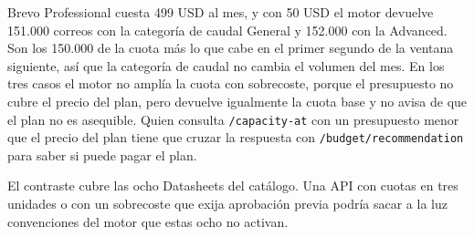 Brevo Professional cuesta 499 USD al mes, y con 50 USD el motor devuelve 151.000 correos con la categoría de caudal General y 152.000 con la Advanced.
Son los 150.000 de la cuota más lo que cabe en el primer segundo de la ventana siguiente, así que la categoría de caudal no cambia el volumen del mes.
En los tres casos el motor no amplía la cuota con sobrecoste, porque el presupuesto no cubre el precio del plan, pero devuelve igualmente la cuota base y no avisa de que el plan no es asequible.
Quien consulta \texttt{/capacity-at} con un presupuesto menor que el precio del plan tiene que cruzar la respuesta con \texttt{/budget/recommendation} para saber si puede pagar el plan.

El contraste cubre las ocho Datasheets del catálogo. Una API con cuotas en tres unidades o con un sobrecoste que exija aprobación previa podría sacar a la luz convenciones del motor que estas ocho no activan.
